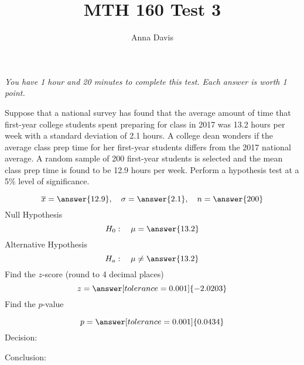 \documentclass{ximera}
\author{Anna Davis} \title{MTH 160 Test 3}
\begin{document}
\begin{abstract}

\end{abstract}
\maketitle
 \textit{You have 1 hour and 20 minutes to complete this test.  Each answer is worth 1 point.}
\begin{problem}\label{prob:exam3prob1}
Suppose that a national survey has found that the average amount of time that first-year college students spent preparing for class in 2017 was 13.2 hours per week with a standard deviation of 2.1 hours.  A college dean wonders if the average class prep time for her first-year students differs from the 2017 national average.  A random sample of 200 first-year students is selected and the mean class prep time is found to be 12.9 hours per week.  Perform a hypothesis test at a 5\% level of significance.

$$\overline{x}=\answer{12.9},\quad \sigma=\answer{2.1},\quad n=\answer{200}$$
Null Hypothesis
$$H_0:\quad \mu=\answer{13.2}$$
Alternative Hypothesis
$$H_a:\quad \mu\neq\answer{13.2}$$
Find the $z$-score (round to 4 decimal places)
$$z=\answer[tolerance=0.001]{-2.0203}$$
Find the $p$-value
\begin{center}  
\end{center}
$$p=\answer[tolerance=0.001]{0.0434}$$
Decision:

\begin{multipleChoice} 
\end{multipleChoice}  

Conclusion:

\begin{multipleChoice} 
\end{multipleChoice} 

\end{problem}
\end{document}
